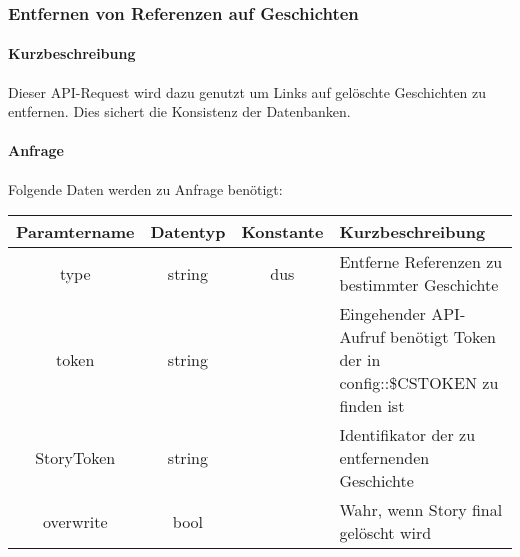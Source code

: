 \subsubsection{Entfernen von Referenzen auf Geschichten}
\paragraph{Kurzbeschreibung}Dieser API-Request wird dazu genutzt um Links auf gelöschte Geschichten zu entfernen. Dies sichert die Konsistenz der Datenbanken.
\paragraph{Anfrage}Folgende Daten werden zu Anfrage benötigt:
\begin{table}[H]
	\begin{tabular}{|c|c|c|p{6.5cm}|}
		\hline
		\textbf{Paramtername} & \textbf{Datentyp} & \textbf{Konstante} & \textbf{Kurzbeschreibung}                                                                                               \\ \hline
		type                & string            & dus                & Entferne Referenzen zu bestimmter Geschichte \\ \hline
		token               & string            &                    & Eingehender API-Aufruf benötigt Token der in config::\$CSTOKEN zu finden ist \\ \hline
		StoryToken          & string            &                    & Identifikator der zu entfernenden Geschichte \\ \hline
		overwrite           & bool              &                    & Wahr, wenn Story final gelöscht wird \\ \hline
	\end{tabular} 
\end{table}
